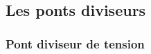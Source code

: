 \documentclass[../../main/main.tex]{subfiles}
\begin{document}
\begin{tcb}[breakable]
\begin{isd}
{\begin{align*}
			\end{align*}
		}%
		\vspace{-15pt}
	\end{isd}
	\vspace{-20pt}
	\tcblower
	\begin{center}
	\end{center}
	\vspace{-30pt}
\end{tcb}

\subsection{Les ponts diviseurs}


\subsubsection{Pont diviseur de tension}
\end{document}
